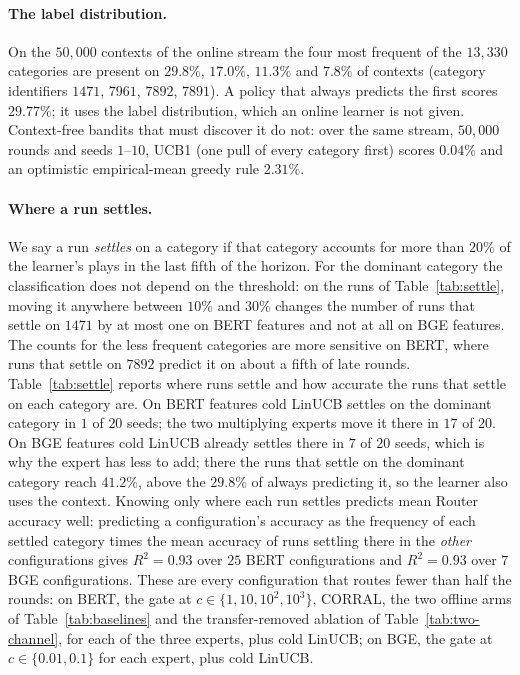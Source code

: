 \documentclass{article}
\theoremstyle{definition}
\theoremstyle{remark}
\theoremstyle{remark}
\begin{document}
\paragraph{The label distribution.}
On the $50{,}000$ contexts of the online stream the four most frequent of the
$13{,}330$ categories are present on $29.8\%$, $17.0\%$, $11.3\%$ and $7.8\%$
of contexts (category identifiers $1471$, $7961$, $7892$, $7891$). A policy
that always predicts the first scores $29.77\%$; it uses the label
distribution, which an online learner is not given. Context-free bandits that
must discover it do not: over the same stream, $50{,}000$ rounds and seeds
$1$--$10$, UCB1 (one pull of every category first) scores $0.04\%$ and an
optimistic empirical-mean greedy rule $2.31\%$.

\paragraph{Where a run settles.}
We say a run \emph{settles} on a category if that category accounts for more
than $20\%$ of the learner's plays in the last fifth of the horizon. For the
dominant category the classification does not depend on the threshold: on the
runs of Table~\ref{tab:settle}, moving it anywhere between $10\%$ and $30\%$
changes the number of runs that settle on $1471$ by at most one on BERT
features and not at all on BGE features. The counts for the less frequent
categories are more sensitive on BERT, where runs that settle on $7892$
predict it on about a fifth of late rounds. Table~\ref{tab:settle}
reports where runs settle and how accurate the runs that settle on each
category are. On BERT features cold LinUCB settles on the dominant category
in $1$ of $20$ seeds; the two multiplying experts move it there in $17$ of
$20$. On BGE features cold LinUCB already settles there in $7$ of $20$ seeds,
which is why the expert has less to add; there the runs that settle on the
dominant category reach $41.2\%$, above the $29.8\%$ of always predicting
it, so the learner also uses the context. Knowing only where each run
settles predicts mean Router accuracy well: predicting a configuration's
accuracy as the frequency of each settled category times the mean accuracy
of runs settling there in the \emph{other} configurations gives $R^2=0.93$
over $25$ BERT configurations and $R^2=0.93$ over $7$ BGE configurations.
These are every configuration that routes fewer than half the rounds: on
BERT, the gate at $c\in\{1,10,10^2,10^3\}$, CORRAL, the two offline arms of
Table~\ref{tab:baselines} and the transfer-removed ablation of
Table~\ref{tab:two-channel}, for each of the three experts, plus cold
LinUCB; on BGE, the gate at $c\in\{0.01,0.1\}$ for each expert, plus cold
LinUCB.
\end{document}
